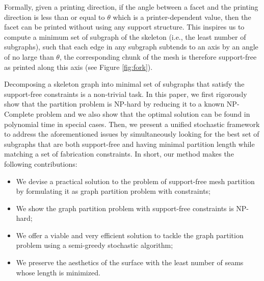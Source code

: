 Formally, given a printing direction, if the angle between a facet and the printing direction is less than or equal to $\theta$ which is a printer-dependent value, then the facet can be printed without using any support structure. This inspires us to compute a minimum set of subgraph of the skeleton (i.e., the least number of subgraphs), such that each edge in any subgraph subtends to an axis by an angle of no large than $\theta$, the corresponding chunk of the mesh is therefore support-free as printed along this axis (see Figure \ref{fig:fork}). %


{Decomposing a skeleton graph into minimal set of subgraphs that satisfy the support-free constraints is a non-trivial task. In this paper, we first rigorously show that the partition problem is NP-hard by reducing it to a known NP-Complete problem and we also show that the optimal solution can be found in polynomial time in {special} cases. Then, we present a unified stochastic framework to address the aforementioned issues by simultaneously looking for} the best set of subgraphs that are both support-free and having minimal partition length while matching a set of fabrication constraints. In short, our method makes the following contributions:

{
\begin{itemize}
\item {We devise a practical solution to the problem of support-free mesh partition by formulating it as graph partition problem with constraints;}
\item {We show the graph partition problem with support-free constraints is NP-hard;}
\item {We offer a viable and very efficient solution to tackle the graph partition problem using a semi-greedy stochastic algorithm;}
\item{We preserve the aesthetics of the surface with the least number of seams whose length is minimized.}
\end{itemize}
}

